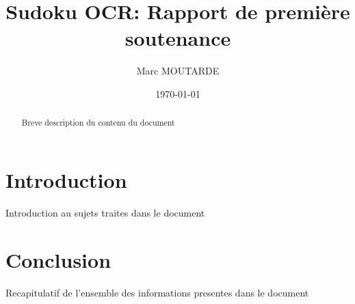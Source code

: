 \documentclass[a4paper]{article}
\title{Sudoku OCR: Rapport de première soutenance}
\author{Marc MOUTARDE}
\date{\today}
\begin{document}
\maketitle

\begin{abstract}
	Breve description du contenu du document
\end{abstract}

\newpage
\tableofcontents
\newpage


\section{Introduction}
	Introduction au sujets traites dans le document

\section{Conclusion}
	Recapitulatif de l'ensemble des informations presentes dans le document
\end{document}
